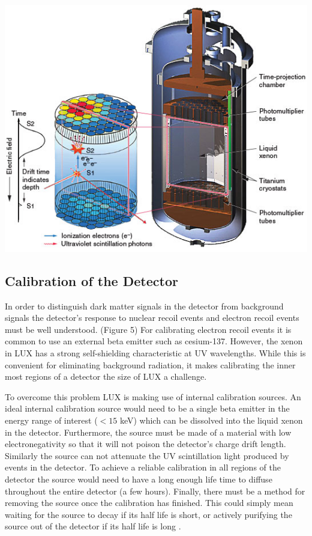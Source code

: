 \documentclass[a4paper,12pt]{article}
\begin{document}
\begin{center}
\includegraphics[scale=0.5]{lux.jpg}
\end{center}

\subsection{Calibration of the Detector}

In order to distinguish dark matter signals in the detector from background signals the detector's response to nuclear recoil events and electron recoil events must be well understood. (Figure 5) For calibrating electron recoil events it is common to use an external beta emitter such as cesium-137.  However, the xenon in LUX has a strong self-shielding characteristic at UV wavelengths.  While this is convenient for eliminating background radiation, it makes calibrating the inner most regions of a detector the size of LUX a challenge.

To overcome this problem LUX is making use of internal calibration sources.  An ideal internal calibration source would need to be a single beta emitter in the energy range of interest ($ <15 $ keV) which can be dissolved into the liquid xenon in the detector.  Furthermore, the source must be made of a material with low electronegativity so that it will not poison the detector's charge drift length.  Similarly the source can not attenuate the UV scintillation light produced by events in the detector.  To achieve a reliable calibration in all regions of the detector the source would need to have a long enough life time to diffuse throughout the entire detector (a few hours).  Finally, there must be a method for removing the source once the calibration has finished.  This could simply mean waiting for the source to decay if its half life is short, or actively purifying the source out of the detector if its half life is long \cite{Kastens}.
\end{document}

